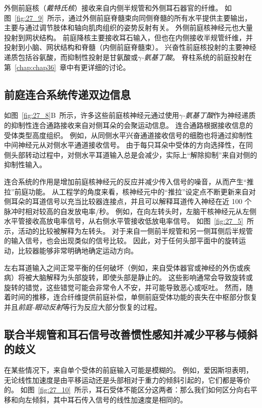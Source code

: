 外侧前庭核（\textit{戴特氏核}）接收来自内侧半规管和外侧耳石器官的纤维。
如图~\ref{fig:27_9}~所示，通过外侧前庭脊髓束向同侧脊髓的所有水平提供主要输出，主要与通过调节肢体和轴向肌肉组织的姿势反射有关。
外侧前庭核神经元也大量投射到网状结构。
前庭降核主要接收耳石输入，但也在内侧接收半规管纤维，并投射到小脑、网状结构和脊髓（内侧前庭脊髓束）。
兴奋性前庭核投射的主要神经递质包括谷氨酸，而抑制性投射是甘氨酸或\textit{$\gamma$-氨基丁酸}。
脊柱系统的前庭投射在第~\ref{chap:chap36}~章中有更详细的讨论。



\subsection{前庭连合系统传递双边信息}

如图~\ref{fig:27_8}B~所示，许多这些前庭核神经元通过使用\textit{$\gamma$-氨基丁酸}作为神经递质的抑制性连合通路接收来自对侧耳朵的会聚运动信息。
连合通路根据接收信息的受体类型高度组织。
例如，从同侧水平兴奋通道接收信号的细胞也将通过抑制性中间神经元从对侧水平通道接收信号。
由于每只耳朵中受体的方向选择性，在同侧头部转动过程中，对侧水平耳道输入总是会减少，实际上“解除抑制”来自对侧的抑制性输入。


连合系统的作用是增加前庭核神经元的反应并减少传入信号的噪音，从而产生“推拉”前庭功能。
从工程学的角度来看，核神经元中的“推拉”设定点不断更新来自对侧耳朵的耳道信号以充当比较器连接点，并且可以解释耳道传入神经在近 100 个脉冲时相对较高的自发放电率/秒。
例如，在向左转头时，左脑干核神经元从左侧水平管接收高放电率信号，从右侧水平管接收低放电率信号。
如图~\ref{fig:27_5}~所示，活动的比较被解释为左转头。
对于来自一侧前半规管和另一侧耳侧后半规管的输入信号，也会出现类似的信号比较。
因此，对于任何头部平面中的旋转运动，比较器能够非常明确地确定运动方向。


左右耳道输入之间正常平衡的任何破坏（例如，来自受体器官或神经的外伤或疾病）将被大脑解释为头部旋转，即使头部是静止的。
这些影响通常会导致旋转或旋转的错觉，这些错觉可能会非常令人不安，并可能导致恶心或呕吐。
然而，随着时间的推移，连合纤维提供前庭补偿，单侧前庭受体功能的丧失在中枢部分恢复并且\textit{前庭-眼动反射}等行为反应大部分恢复的过程。



\subsection{联合半规管和耳石信号改善惯性感知并减少平移与倾斜的歧义}

在某些情况下，来自单个受体的前庭输入可能是模糊的。
例如，爱因斯坦\cite{einstein1908relativitatsprinzip}表明，无论线性加速度是由平移运动还是头部相对于重力的倾斜引起的，它们都是等价的。
如图~\ref{fig:27_10}~所示，耳石受体不能区分这两者：那么我们如何区分向右平移和向左倾斜，其中耳石传入信号的线性加速度是相同的。



